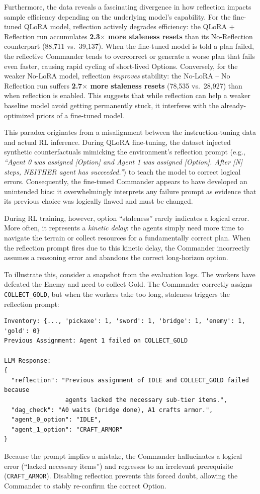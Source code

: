 Furthermore, the data reveals a fascinating divergence in how reflection impacts sample efficiency depending on the underlying model's capability. For the fine-tuned QLoRA model, reflection actively degrades efficiency: the QLoRA + Reflection run accumulates \textbf{2.3$\times$ more staleness resets} than its No-Reflection counterpart (88{,}711 vs.\ 39{,}137). When the fine-tuned model is told a plan failed, the reflective Commander tends to overcorrect or generate a worse plan that fails even faster, causing rapid cycling of short-lived Options. Conversely, for the weaker No-LoRA model, reflection \textit{improves} stability: the No-LoRA -- No Reflection run suffers \textbf{2.7$\times$ more staleness resets} (78{,}535 vs.\ 28{,}927) than when reflection is enabled. This suggests that while reflection can help a weaker baseline model avoid getting permanently stuck, it interferes with the already-optimized priors of a fine-tuned model.

This paradox originates from a misalignment between the instruction-tuning data and actual RL inference. During QLoRA fine-tuning, the dataset injected synthetic counterfactuals mimicking the environment's reflection prompt (e.g., \emph{``Agent 0 was assigned [Option] and Agent 1 was assigned [Option]. After [N] steps, NEITHER agent has succeeded.''}) to teach the model to correct logical errors. Consequently, the fine-tuned Commander appears to have developed an unintended bias: it overwhelmingly interprets any failure prompt as evidence that its previous choice was logically flawed and must be changed.

During RL training, however, option ``staleness'' rarely indicates a logical error. More often, it represents a \emph{kinetic delay}: the agents simply need more time to navigate the terrain or collect resources for a fundamentally correct plan. When the reflection prompt fires due to this kinetic delay, the Commander incorrectly assumes a reasoning error and abandons the correct long-horizon option.

To illustrate this, consider a snapshot from the evaluation logs. The workers have defeated the Enemy and need to collect Gold. The Commander correctly assigns \texttt{COLLECT\_GOLD}, but when the workers take too long, staleness triggers the reflection prompt:

\begin{verbatim}
Inventory: {..., 'pickaxe': 1, 'sword': 1, 'bridge': 1, 'enemy': 1, 'gold': 0}
Previous Assignment: Agent 1 failed on COLLECT_GOLD

LLM Response:
{
  "reflection": "Previous assignment of IDLE and COLLECT_GOLD failed because 
                 agents lacked the necessary sub-tier items.",
  "dag_check": "A0 waits (bridge done), A1 crafts armor.",
  "agent_0_option": "IDLE",
  "agent_1_option": "CRAFT_ARMOR"
}
\end{verbatim}
Because the prompt implies a mistake, the Commander hallucinates a logical error (``lacked necessary items'') and regresses to an irrelevant prerequisite (\texttt{CRAFT\_ARMOR}). Disabling reflection prevents this forced doubt, allowing the Commander to stably re-confirm the correct Option.

